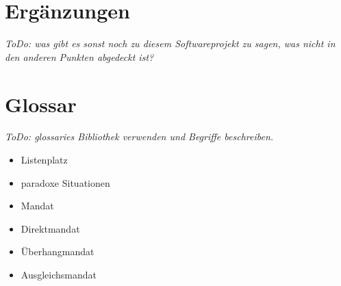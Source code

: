 \documentclass[10pt,a4paper]{article}
\begin{document}
\section{Ergänzungen}
\textit{ToDo: was gibt es sonst noch zu diesem Softwareprojekt zu sagen, was nicht in den anderen Punkten abgedeckt ist?}

\section{Glossar}
\textit{ToDo: glossaries Bibliothek verwenden und Begriffe beschreiben.}
\begin{itemize}
	\item Listenplatz
	\item paradoxe Situationen
	\item Mandat	
	\item Direktmandat	
	\item Überhangmandat
	\item Ausgleichsmandat
\end{itemize}
\end{document}
